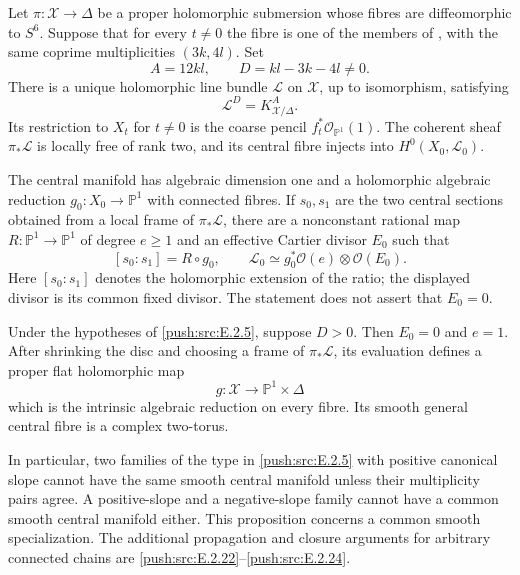 \begin{proposition}\hypertarget{tag-033D}{}\label{push:src:E.2.5}


Let $\pi:\mathcal X\to\Delta$ be a proper holomorphic submersion
whose fibres are diffeomorphic to $S^6$.  Suppose that for every
$t\ne0$ the fibre is one of the members of , with the same
coprime multiplicities $(3k,4l)$.  Set
\[
 A=12kl,\qquad D=kl-3k-4l\ne0.
\]
There is a unique holomorphic line bundle $\mathcal L$ on
$\mathcal X$, up to isomorphism, satisfying
\[
 \mathcal L^{D}=K_{\mathcal X/\Delta}^{A}.
\]
Its restriction to $X_t$ for $t\ne0$ is the coarse pencil
$f_t^*\mathcal O_{\mathbb P^1}(1)$.  The coherent sheaf
$\pi_*\mathcal L$ is locally free of rank two, and its central
fibre injects into $H^0(X_0,\mathcal L_0)$.

The central manifold has algebraic dimension one and a
holomorphic algebraic reduction $g_0:X_0\to\mathbb P^1$ with
connected fibres.  If $s_0,s_1$ are the two central sections
obtained from a local frame of $\pi_*\mathcal L$, there are a
nonconstant rational map $R:\mathbb P^1\to\mathbb P^1$ of
degree $e\ge1$ and an effective Cartier divisor $E_0$ such that
\[
 [s_0:s_1]=R\circ g_0,\qquad
 \mathcal L_0\simeq g_0^*\mathcal O(e)\otimes\mathcal O(E_0).
\]
Here $[s_0:s_1]$ denotes the holomorphic extension of the ratio;
the displayed divisor is its common fixed divisor.  The
statement does not assert that $E_0=0$.
\end{proposition}

\begin{proposition}\hypertarget{tag-033E}{}\label{push:src:E.2.6}


Under the hypotheses of \ref{push:src:E.2.5}, suppose $D>0$.  Then $E_0=0$
and $e=1$.  After shrinking the disc and choosing a frame of
$\pi_*\mathcal L$, its evaluation defines a proper flat
holomorphic map
\[
 g:\mathcal X\longrightarrow\mathbb P^1\times\Delta
\]
which is the intrinsic algebraic reduction on every fibre.
Its smooth general central fibre is a complex two-torus.

In particular, two families of the type in \ref{push:src:E.2.5} with positive
canonical slope cannot have the same smooth central manifold
unless their multiplicity pairs agree.  A positive-slope and
a negative-slope family cannot have a common smooth central
manifold either.  This proposition concerns a common smooth
specialization.  The additional propagation and closure
arguments for arbitrary connected chains are \ref{push:src:E.2.22}--\ref{push:src:E.2.24}.
\end{proposition}

